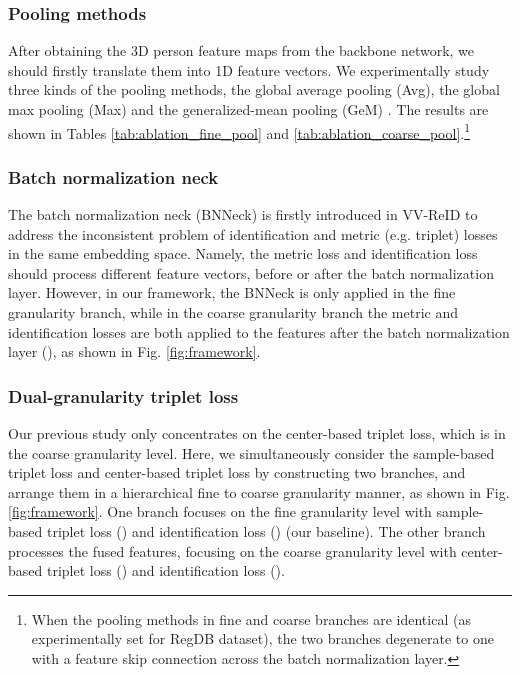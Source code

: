 \documentclass[journal]{IEEEtran}
\begin{document}
\subsubsection{Pooling methods}
After obtaining the 3D person feature maps from the backbone network, we should firstly translate them into 1D feature vectors. We experimentally study three kinds of the pooling methods, the global average pooling (Avg), the global max pooling (Max) and the generalized-mean pooling (GeM) \cite{radenovic2018fine}. The results are shown in Tables \ref{tab:ablation_fine_pool} and \ref{tab:ablation_coarse_pool}.\footnote{When the pooling methods in fine and coarse branches are identical (as experimentally set for RegDB dataset), the two branches degenerate to one with a feature skip connection across the batch normalization layer.}

\subsubsection{Batch normalization neck}
The batch normalization neck (BNNeck) \cite{Luo2019ASB} is firstly introduced in VV-ReID to address the inconsistent problem of identification and metric (e.g. triplet) losses in the same embedding space. Namely, the metric loss and identification loss should process different feature vectors, before or after the batch normalization layer. However, in our framework, the BNNeck is only applied in the fine granularity branch, while in the coarse granularity branch the metric and identification losses are both applied to the features after the batch normalization layer (), as shown in Fig. \ref{fig:framework}.

\subsubsection{Dual-granularity triplet loss}
Our previous study \cite{Liu2020ParametersSE} only concentrates on the center-based triplet loss, which is in the coarse granularity level. Here, we simultaneously consider the sample-based triplet loss and center-based triplet loss by constructing two branches, and arrange them in a hierarchical fine to coarse granularity manner, as shown in Fig. \ref{fig:framework}. One branch focuses on the fine granularity level with sample-based triplet loss () and identification loss () (our baseline). The other branch processes the fused features, focusing on the coarse granularity level with center-based triplet loss () and identification loss ().
\end{document}
